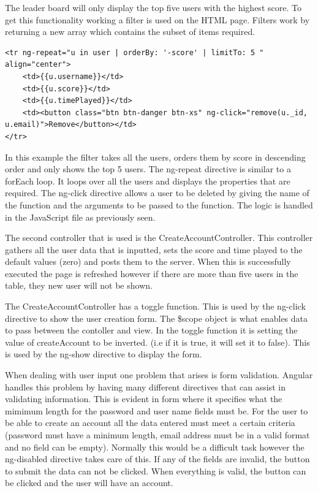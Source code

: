 \documentclass[12pt]{article}
\begin{document}
The leader board will only display the top five users with the highest score. To get this functionality working a filter is used on the HTML page. Filters work by returning a new array which contains the subset of items required.


\begin{lstlisting}
<tr ng-repeat="u in user | orderBy: '-score' | limitTo: 5 " align="center">
	<td>{{u.username}}</td>
	<td>{{u.score}}</td>
	<td>{{u.timePlayed}}</td>
	<td><button class="btn btn-danger btn-xs" ng-click="remove(u._id, 						u.email)">Remove</button></td>
</tr>
\end{lstlisting}

In this example the filter takes all the users, orders them by score in descending order and only shows the top 5 users. The ng-repeat directive is similar to a forEach loop. It loops over all the users and displays the properties that are required. The ng-click directive allows a user to be deleted by giving the name of the function and the arguments to be passed to the function. The logic is handled in the JavaScript file as previously seen. 

The second controller that is used is the CreateAccountController. This controller gathers all the user data that is inputted, sets the score and time played to the default values (zero) and posts them to the server. When this is successfully executed the page is refreshed however if there are more than five users in the table, they new user will not be shown. 

The CreateAccountController has a toggle function. This is used by the ng-click directive to show the user creation form. The {\$}scope object is what enables data to pass between the contoller and view. In the toggle function it is setting the value of createAccount to be inverted. (i.e if it is true, it will set it to false). This is used by the ng-show directive to display the form.

When dealing with user input one problem that arises is form validation. Angular handles this problem by having many different directives that can assist in validating information. This is evident in form where it specifies what the mimimum length for the password and user name fields must be. For the user to be able to create an account all the data entered must meet a certain criteria (password must have a minimum length, email address must be in a valid format and no field can be empty). Normally this would be a difficult task however the ng-disabled directive takes care of this. If any of the fields are invalid, the button to submit the data can not be clicked. When everything is valid, the button can be clicked and the user will have an account. 
\end{document}
